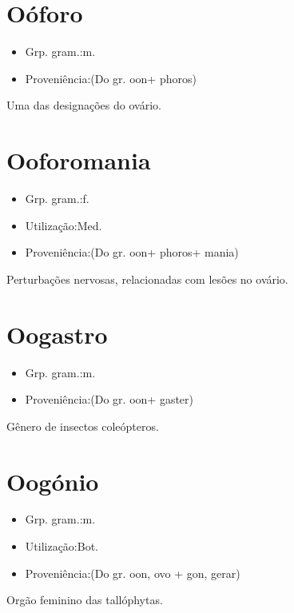 \section{Oóforo}
\begin{itemize}
\item {Grp. gram.:m.}
\end{itemize}
\begin{itemize}
\item {Proveniência:(Do gr. \textunderscore oon\textunderscore  + \textunderscore phoros\textunderscore )}
\end{itemize}
Uma das designações do \textunderscore ovário\textunderscore .
\section{Ooforomania}
\begin{itemize}
\item {Grp. gram.:f.}
\end{itemize}
\begin{itemize}
\item {Utilização:Med.}
\end{itemize}
\begin{itemize}
\item {Proveniência:(Do gr. \textunderscore oon\textunderscore  + \textunderscore phoros\textunderscore  + \textunderscore mania\textunderscore )}
\end{itemize}
Perturbações nervosas, relacionadas com lesões no ovário.
\section{Oogastro}
\begin{itemize}
\item {Grp. gram.:m.}
\end{itemize}
\begin{itemize}
\item {Proveniência:(Do gr. \textunderscore oon\textunderscore  + \textunderscore gaster\textunderscore )}
\end{itemize}
Gênero de insectos coleópteros.
\section{Oogónio}
\begin{itemize}
\item {Grp. gram.:m.}
\end{itemize}
\begin{itemize}
\item {Utilização:Bot.}
\end{itemize}
\begin{itemize}
\item {Proveniência:(Do gr. \textunderscore oon\textunderscore , ovo + \textunderscore gon\textunderscore , gerar)}
\end{itemize}
Orgão feminino das tallóphytas.
